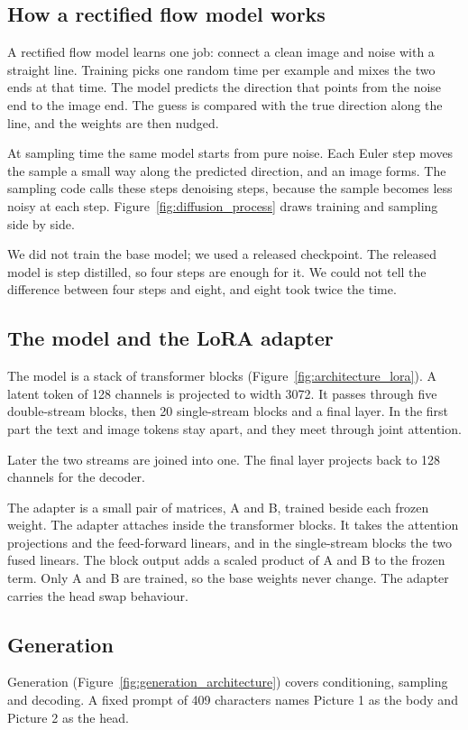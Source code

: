
\subsection{How a rectified flow model works}
A rectified flow model learns one job: connect a clean image and noise with a straight line. Training picks one random time per example and mixes the two ends at that time. The model predicts the direction that points from the noise end to the image end. The guess is compared with the true direction along the line, and the weights are then nudged.

At sampling time the same model starts from pure noise. Each Euler step moves the sample a small way along the predicted direction, and an image forms. The sampling code calls these steps denoising steps, because the sample becomes less noisy at each step. Figure~\ref{fig:diffusion_process} draws training and sampling side by side.

We did not train the base model; we used a released checkpoint. The released model is step distilled, so four steps are enough for it. We could not tell the difference between four steps and eight, and eight took twice the time.


\subsection{The model and the LoRA adapter}
The model is a stack of transformer blocks (Figure~\ref{fig:architecture_lora}). A latent token of 128 channels is projected to width 3072. It passes through five double-stream blocks, then 20 single-stream blocks and a final layer. In the first part the text and image tokens stay apart, and they meet through joint attention.

Later the two streams are joined into one. The final layer projects back to 128 channels for the decoder.

The adapter is a small pair of matrices, A and B, trained beside each frozen weight. The adapter attaches inside the transformer blocks. It takes the attention projections and the feed-forward linears, and in the single-stream blocks the two fused linears. The block output adds a scaled product of A and B to the frozen term. Only A and B are trained, so the base weights never change. The adapter carries the head swap behaviour.


\subsection{Generation}
Generation (Figure~\ref{fig:generation_architecture}) covers conditioning, sampling and decoding. A fixed prompt of 409 characters names Picture 1 as the body and Picture 2 as the head.

